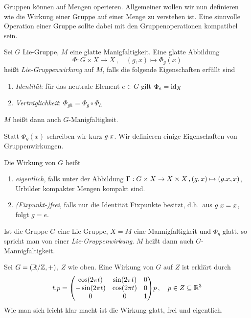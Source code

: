 Gruppen können auf Mengen operieren.  
Allgemeiner wollen wir nun definieren wie die Wirkung einer Gruppe auf einer
Menge zu verstehen ist. Eine sinnvolle Operation einer Gruppe sollte dabei mit
den Gruppenoperationen kompatibel sein.
\begin{definition}[Gruppenwirkung]
Sei $G$ Lie-Gruppe, $M$ eine glatte Manigfaltigkeit. Eine glatte Abbildung
\begin{equation}
\Phi:G\times X\to X\,,\quad (g,x)\mapsto\Phi_g(x)
\end{equation}
heißt \emph{Lie-Gruppenwirkung} auf $M$, falls die folgende
Eigenschaften erfüllt sind
\begin{enumerate}
  \item \emph{Identität}: für das neutrale Element $e\in G$ gilt
  $\displaystyle\Phi_e=\operatorname{id}_X$
  \item \emph{Verträglichkeit}: $\displaystyle\Phi_{gh}=\Phi_g\circ\Phi_h$
\end{enumerate}
$M$ heißt dann auch $G$-Manigfaltigkeit.
\end{definition}
Statt $\Phi_g(x)$ schreiben wir kurz $g. x$.
Wir definieren einige
Eigenschaften von Gruppenwirkungen.
\begin{definition}
Die Wirkung von $G$ heißt
\begin{enumerate}
  \item \emph{eigentlich}, falls unter der Abbildung $\Gamma:
  G\times X\to X\times X\,,(g,x)\mapsto (g . x,x)$, Urbilder kompakter
  Mengen kompakt sind.
  \item \emph{(Fixpunkt-)frei}, falls nur die Identität Fixpunkte besitzt, d.h.\
  aus $g. x=x$, folgt $g=e$.
\end{enumerate}
Ist die Gruppe $G$ eine Lie-Gruppe, $X=M$ eine Mannigfaltigkeit und $\Phi_g$
glatt, so spricht man von einer \emph{Lie-Gruppenwirkung}. $M$ heißt dann
auch $G$-Mannigfaltigkeit.
\end{definition}
\begin{beispiel}
Sei $G=(\mathbb{R}/\mathbb{Z},+)$, $Z$ wie oben. Eine Wirkung von $G$ auf $Z$ ist
erklärt durch
\begin{equation}
t.p= \begin{pmatrix}
\cos\left( 2\pi t\right)&\sin\left( 2\pi t\right)&0\\
-\sin\left( 2\pi t\right)&\cos\left( 2\pi t\right)&0\\
0&0&1
\end{pmatrix}p\,,\quad p\in Z\subseteq \Reals^3
\end{equation}
Wie man sich leicht klar macht ist die Wirkung glatt, frei und eigentlich.
\end{beispiel}
